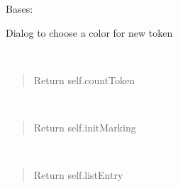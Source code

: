 \documentclass[a4paper,10pt,english]{sphinxmanual}
\begin{document}
\begin{fulllineitems}
\label{gui_link:gui.TokenDialog.TokenDialog}
Bases: 

Dialog to choose a color for new token

\begin{fulllineitems}
\label{gui_link:gui.TokenDialog.TokenDialog.cancel}
\end{fulllineitems}


\begin{fulllineitems}
\label{gui_link:gui.TokenDialog.TokenDialog.getCountToken}~\begin{quote}\begin{description}
\item[{Return self.countToken}] \leavevmode
\end{description}\end{quote}

\end{fulllineitems}


\begin{fulllineitems}
\label{gui_link:gui.TokenDialog.TokenDialog.getInitMarking}~\begin{quote}\begin{description}
\item[{Return self.initMarking}] \leavevmode
\end{description}\end{quote}

\end{fulllineitems}


\begin{fulllineitems}
\label{gui_link:gui.TokenDialog.TokenDialog.getListEntry}~\begin{quote}\begin{description}
\item[{Return self.listEntry}] \leavevmode
\end{description}\end{quote}


\end{fulllineitems}
\end{fulllineitems}
\end{document}
